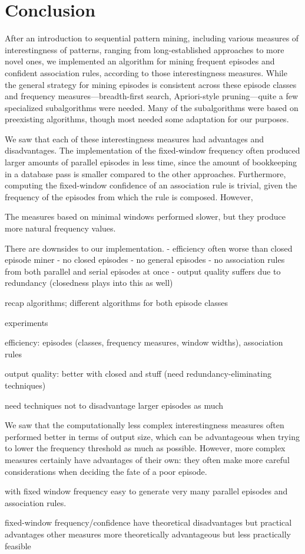 \chapter{Conclusion}


After an introduction to sequential pattern mining, including various measures of interestingness of patterns, ranging from long-established approaches to more novel ones, we implemented an algorithm for mining frequent episodes and confident association rules, according to those interestingness measures. While the general strategy for mining episodes is consistent across these episode classes and frequency measures---breadth-first search, Apriori-style pruning---quite a few specialized subalgorithms were needed. Many of the subalgorithms were based on preexisting algorithms, though most needed some adaptation for our purposes.


We saw that each of these interestingness measures had advantages and disadvantages. The implementation of the fixed-window frequency often produced larger amounts of parallel episodes in less time, since the amount of bookkeeping in a database pass is smaller compared to the other approaches. Furthermore, computing the fixed-window confidence of an association rule is trivial, given the frequency of the episodes from which the rule is composed. However, 

The measures based on minimal windows performed slower, but they produce more natural frequency values.


There are downsides to our implementation.
- efficiency often worse than closed episode miner
- no closed episodes
- no general episodes
- no association rules from both parallel and serial episodes at once
- output quality suffers due to redundancy (closedness plays into this as well)

recap algorithms; different algorithms for both episode classes

experiments

efficiency: episodes (classes, frequency measures, window widths), association rules

output quality: better with closed and stuff (need redundancy-eliminating techniques)

need techniques not to disadvantage larger episodes as much

We saw that the computationally less complex interestingness measures often performed better in terms of output size, which can be advantageous when trying to lower the frequency threshold as much as possible. However, more complex measures certainly have advantages of their own: they often make more careful considerations when deciding the fate of a poor episode.

with fixed window frequency easy to generate very many parallel episodes and association rules.

fixed-window frequency/confidence have theoretical disadvantages but practical advantages
other measures more theoretically advantageous but less practically feasible
